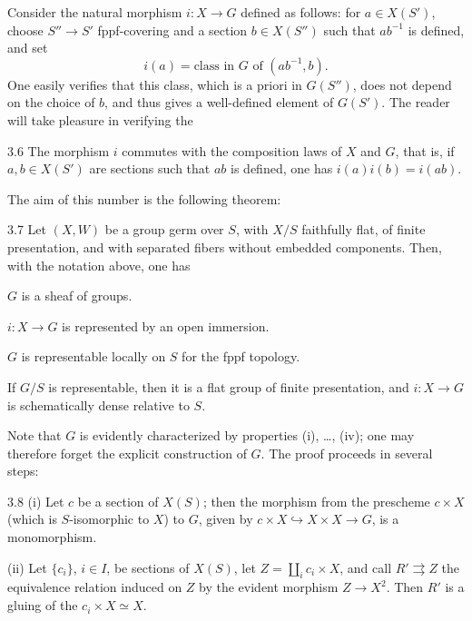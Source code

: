 Consider the natural morphism \(i:X\to G\)
defined as follows: for \(a\in X(S')\),
choose \(S''\to S'\) fppf-covering
and a section \(b\in X(S'')\)
such that \(ab^{-1}\) is defined, and set
\[
i(a)=\text{class in }G\text{ of }(ab^{-1},b).
\]
One easily verifies that this class,
which is a priori in \(G(S'')\),
does not depend on the choice of \(b\),
and thus gives a well-defined element
of \(G(S')\).
The reader will take pleasure in verifying the
\begin{proposition}{3.6}\label{XVIII.3.6}
The morphism \(i\) commutes with the
composition laws of \(X\) and \(G\),
that is, if \(a,b\in X(S')\)
are sections such that \(ab\) is
defined, one has \(i(a)i(b)=i(ab)\).
\end{proposition}
The aim of this number is the following theorem:
\begin{theorem}{3.7}\label{XVIII.3.7}
Let \((X,W)\) be a group germ
over \(S\), with \(X/S\) faithfully
flat, of finite presentation, and
with separated fibers without
embedded components.
Then, with the notation above, one has
\begin{enumeratei}
\item \(G\) is a sheaf of groups.
\item \(i:X\to G\) is represented by an open immersion.
\item \(G\) is representable locally
on \(S\) for the fppf topology.
\item If \(G/S\) is representable,
then it is a flat group of finite
presentation, and \(i:X\to G\)
is schematically dense relative to \(S\).
\end{enumeratei}
\end{theorem}
Note that \(G\) is evidently
characterized by properties (i),
\ldots, (iv); one may therefore
forget the explicit construction of \(G\).
The proof proceeds in several steps:
\begin{lemma}{3.8}\label{XVIII.3.8}
(i) Let \(c\) be a section of
\(X(S)\); then the morphism
from the prescheme \(c\times X\)
(which is \(S\)-isomorphic to
\(X\)) to \(G\), given by
\(c\times X\hookrightarrow X\times X\to G\),
is a monomorphism.

(ii) Let \(\{c_i\}\), \(i\in I\),
be sections of \(X(S)\),
let \(Z=\coprod_i c_i\times X\),
and call \(R'\rightrightarrows Z\)
the equivalence relation induced
on \(Z\) by the evident morphism
\(Z\to X^2\).
Then \(R'\) is a \og gluing\fg{}
of the \(c_i\times X\simeq X\).
\end{lemma}
